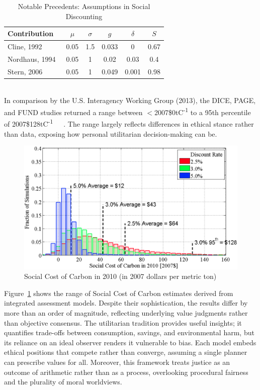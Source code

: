 \documentclass[12pt, oneside]{article}   	%
\begin{document}
\begin{table}[H]
\caption{Notable Precedents: Assumptions in Social Discounting}
\begin{center}
\begin{tabular}{| l | c | c | c | c | c |}
\hline
Contribution&$\mu$&$\sigma$&$g$&$\delta$&$S$\\
\hline
Cline, 1992~\cite{wc1}&0.05&1.5&0.033&0&0.67 \\
Nordhaus, 1994~\cite{wn1}&0.05&1&0.02&0.03&0.4 \\
Stern, 2006~\cite{ns1}&0.05&1&0.049&0.001&0.98 \\
\hline
\end{tabular}
\end{center}
\label{Social contributions table}
\end{table}\\

In comparison by the U.S. Interagency Working Group (2013), the DICE, PAGE, and FUND studies returned a range between $<$2007\$0tC\textsuperscript{-1} to a 95th percentile of 2007\$128tC\textsuperscript{-1}~\cite{wn1}~\cite{ch1}~\cite{rsjt1}.
The range largely reflects differences in ethical stance rather than data, exposing how personal utilitarian decision-making can be.\\

\begin{figure}[H]
	\centering
	\includegraphics[width=1\textwidth]{scc}
	\caption{Social Cost of Carbon in 2010 (in 2007 dollars per metric ton)}
	\label{USA SCC figure}
\end{figure}

Figure~\ref{USA SCC figure} shows the range of Social Cost of Carbon estimates derived from integrated assessment models.
Despite their sophistication, the results differ by more than an order of magnitude, reflecting underlying value judgments rather than objective consensus.
The utilitarian tradition provides useful insights; it quantifies trade-offs between consumption, savings, and environmental harm, but its reliance on an ideal observer renders it vulnerable to bias.
Each model embeds ethical positions that compete rather than converge, assuming a single planner can prescribe values for all.
Moreover, this framework treats justice as an outcome of arithmetic rather than as a process, overlooking procedural fairness and the plurality of moral worldviews.\\
\end{document}
